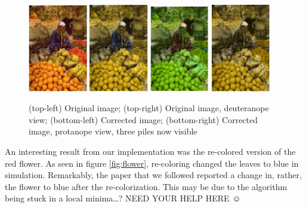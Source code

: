 \documentclass[10pt,twocolumn,letterpaper]{article}
\begin{document}
\begin{figure}[h]
  \includegraphics[width=0.23\textwidth]{fruits1.png}
 \includegraphics[width=0.23\textwidth]{fruits3.png}
\includegraphics[width=0.23\textwidth]{fruits2.png}
  \includegraphics[width=0.23\textwidth]{fruits4.png}
  \caption{(top-left) Original image; (top-right) Original image, deuteranope view; (bottom-left) Corrected image; (bottom-right) Corrected image, protanope view, three piles now visible}
  \label{fig:fruits}
\end{figure}

An interesting result from our implementation was the re-colored version of the red flower. As seen in figure \ref{fig:flower}, re-coloring changed the leaves to blue in simulation. Remarkably, the paper that we followed reported a change in, rather, the flower to blue after the re-colorization. This may be due to the algorithm being stuck in a local minima…? NEED YOUR HELP HERE ☺ 
\end{document}
